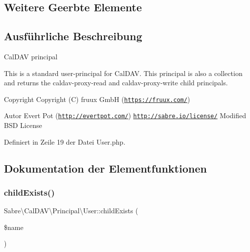 \subsection*{Weitere Geerbte Elemente}


\subsection{Ausführliche Beschreibung}
Cal\+D\+AV principal

This is a standard user-\/principal for Cal\+D\+AV. This principal is also a collection and returns the caldav-\/proxy-\/read and caldav-\/proxy-\/write child principals.

\begin{DoxyCopyright}{Copyright}
Copyright (C) fruux GmbH (\href{https://fruux.com/}{\tt https\+://fruux.\+com/}) 
\end{DoxyCopyright}
\begin{DoxyAuthor}{Autor}
Evert Pot (\href{http://evertpot.com/}{\tt http\+://evertpot.\+com/})  \href{http://sabre.io/license/}{\tt http\+://sabre.\+io/license/} Modified B\+SD License 
\end{DoxyAuthor}


Definiert in Zeile 19 der Datei User.\+php.



\subsection{Dokumentation der Elementfunktionen}
\mbox{\label{class_sabre_1_1_cal_d_a_v_1_1_principal_1_1_user_a4a3f312b08c5c80ff35fdf00ae8c92f8}} 
\subsubsection{\texorpdfstring{child\+Exists()}{childExists()}}
{\footnotesize\ttfamily Sabre\textbackslash{}\+Cal\+D\+A\+V\textbackslash{}\+Principal\textbackslash{}\+User\+::child\+Exists (\begin{DoxyParamCaption}\item[{}]{\$name }\end{DoxyParamCaption})}


